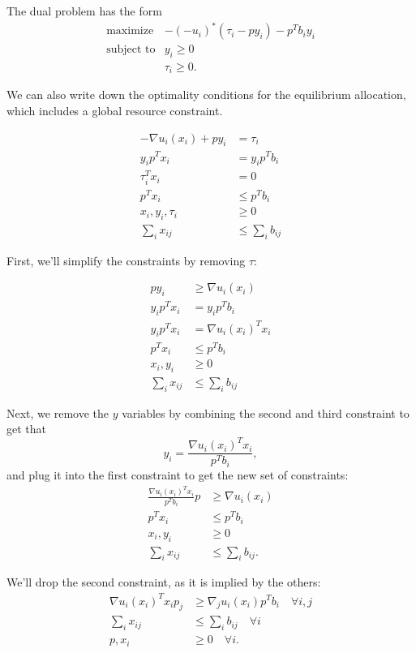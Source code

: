 \documentclass[12pt]{article}
\begin{document}
The dual problem has the form
\[
\begin{array}{ll}
\mbox{maximize} & -(- u_i)^*(\tau_i - p y_i) - p^T b_i y_i\\
\mbox{subject to} & y_i \geq 0\\
& \tau_i \geq 0.
\end{array}
\]

We can also write down the optimality conditions for the equilibrium allocation,
which includes a global resource constraint.

\begin{align*}
-\nabla u_i(x_i) + p y_i &= \tau_i\\
y_i p^T x_i &= y_i p^T b_i \\
\tau_i^T x_i &= 0\\
p^T x_i &\leq p^T b_i\\
x_i, y_i, \tau_i &\geq 0\\
\sum_{i} x_{ij} &\leq \sum_{i} b_{ij}
\end{align*}

First, we'll simplify the constraints by removing $\tau$:

\begin{align*}
p y_i &\geq \nabla u_i(x_i) \\
y_i p^T x_i &= y_i p^T b_i \\
y_i p^T x_i &= \nabla u_i(x_i)^T x_i\\
p^T x_i &\leq p^T b_i\\
x_i, y_i &\geq 0\\
\sum_{i} x_{ij} &\leq \sum_{i} b_{ij}
\end{align*}

Next, we remove the $y$ variables by combining the second and third constraint
to get that
\[
y_i = \frac{\nabla u_i(x_i)^T x_i}{p^T b_i},
\]
and plug it into the first constraint to get the new set of constraints:
\begin{align*}
\frac{\nabla u_i(x_i)^T x_i}{p^T b_i} p &\geq \nabla u_i(x_i) \\
p^T x_i &\leq p^T b_i\\
x_i, y_i &\geq 0\\
\sum_{i} x_{ij} &\leq \sum_{i} b_{ij}.
\end{align*}

We'll drop the second constraint, as it is implied by the others:
\begin{align*}
\nabla u_i(x_i)^T x_i p_j &\geq \nabla_j u_i(x_i) p^T b_i\quad \forall i,j \\
\sum_{i} x_{ij} &\leq \sum_{i} b_{ij}\quad \forall i\\
p, x_i &\geq 0\quad \forall i.
\end{align*}
\end{document}
